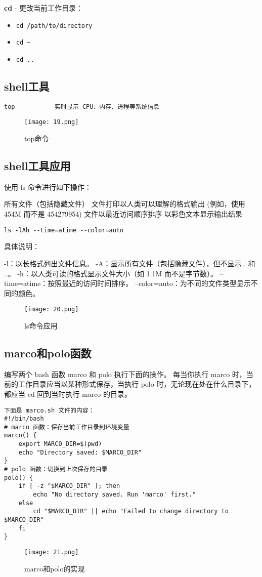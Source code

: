 \documentclass[a4paper, 12pt]{article}
\begin{document}
\textbf{cd} - 更改当前工作目录：
\begin{itemize}
    \item \texttt{cd /path/to/directory}  %
    \item \texttt{cd \textasciitilde}      %
    \item \texttt{cd ..}                  %
\end{itemize}


 

\subsection{shell工具}  
\begin{lstlisting}
top           实时显示 CPU、内存、进程等系统信息
\end{lstlisting}
\begin{figure}[H]
  \centering
    \texttt{[image: 19.png]}
  \caption{top命令}
   \end{figure}

\subsection{shell工具应用}  
使用 ls 命令进行如下操作：

所有文件（包括隐藏文件）
文件打印以人类可以理解的格式输出 (例如，使用 454M 而不是 454279954)
文件以最近访问顺序排序
以彩色文本显示输出结果

\begin{lstlisting}
ls -lAh --time=atime --color=auto
\end{lstlisting}
具体说明：

-l：以长格式列出文件信息。
-A：显示所有文件（包括隐藏文件），但不显示 . 和 ..。
-h：以人类可读的格式显示文件大小（如 1.1M 而不是字节数）。
--time=atime：按照最近的访问时间排序。
--color=auto：为不同的文件类型显示不同的颜色。
\begin{figure}[H]
  \centering
    \texttt{[image: 20.png]}
  \caption{ls命令应用}
   \end{figure}

  \subsection{marco和polo函数}  
  编写两个 bash 函数 marco 和 polo 执行下面的操作。 每当你执行 marco 时，当前的工作目录应当以某种形式保存，当执行 polo 时，无论现在处在什么目录下，都应当 cd 回到当时执行 marco 的目录。
\begin{lstlisting}
下面是 marco.sh 文件的内容：
#!/bin/bash
# marco 函数：保存当前工作目录到环境变量
marco() {
    export MARCO_DIR=$(pwd)
    echo "Directory saved: $MARCO_DIR"
}
# polo 函数：切换到上次保存的目录
polo() {
    if [ -z "$MARCO_DIR" ]; then
        echo "No directory saved. Run 'marco' first."
    else
        cd "$MARCO_DIR" || echo "Failed to change directory to $MARCO_DIR"
    fi
}
\end{lstlisting}
\begin{figure}[H]
  \centering
    \texttt{[image: 21.png]}
  \caption{marco和polo的实现}
   \end{figure}
\end{document}

